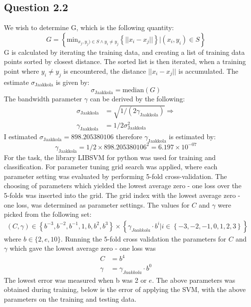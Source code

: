 \documentclass{article}
\begin{document}
\subsection{Question 2.2}
We wish to determine G, which is the following quantity:
\begin{equation}
G = \left\lbrace \text{min}_{x_j,y_j) \in S \wedge y_i \neq y_j}
\left\lbrace || x_i - x_j || \right\rbrace | (x_i,y_i) \in S \right\rbrace 
\end{equation}
G is calculated by iterating the training data, and creating a list of training data points sorted by closest distance. The sorted list is then iterated, when a training point where $y_i \neq y_j$ is encountered, the distance $||x_i-x_j||$ is accumulated. The estimate $\sigma_{\text{Jaakkola}}$ is given by:
\begin{equation}
\sigma_{\text{Jaakkola}} = \text{median}(G)
\end{equation}
The bandwidth parameter $\gamma$ can be derived by the following:
\begin{align*}
\sigma_{\text{Jaakkola}} &= \sqrt{1 / (2\gamma_{\text{Jaakkola}})} \Rightarrow \\
\gamma_{\text{Jaakkola}} &= 1/2\sigma^2_{\text{Jaakkola}}
\end{align*}
I estimated $\sigma_{\text{Jaakkola}} = 898.205380106$
therefore $\gamma_{\text{Jaakkola}}$ is estimated by:
\begin{equation}
\gamma_{\text{Jaakkola}} = 1 / 2 \times 898.205380106^2 = 6.197 \times 10^{-07}
\end{equation}
For the task, the library LIBSVM for python was used for training and classification. For parameter tuning grid search was applied, where each parameter setting was evaluated by performing 5-fold cross-validation. The choosing of parameters which yielded the lowest average zero - one loss over the 5-folds was inserted into the grid. The grid index with the lowest average zero - one loss, was determined as parameter settings. The values for $C$ and $\gamma$ were picked from the following set:
\begin{align*}
(C,\gamma) \in \left\{ b^{-3}, b^{-2}, b^{-1}, 1, b, b^{2}, b^{3} \right\} \times \left\{ \gamma_{Jaakkola} \cdot b^{i} | i \in \left\{ -3, -2, -1, 0, 1, 2, 3 \right\} \right\}
\end{align*}
where $b \in \lbrace 2, e, 10 \rbrace$.
Running the 5-fold cross validation the parameters for $C$ and $\gamma$ which gave the lowest average zero - one loss was
\begin{align*}
C &= b^4 \\
\gamma &= \gamma_{Jaakkola} \cdot b^0
\end{align*}
The lowest error was measured when b was 2 or $e$. The above parameters was obtained during training, below is the error of applying the SVM, with the above parameters on the training and testing data.
\end{document}
